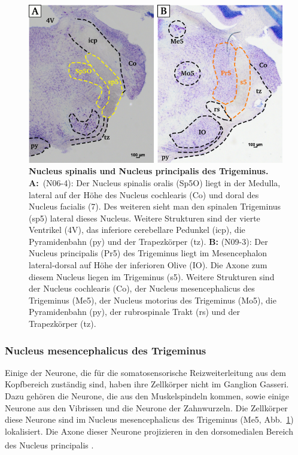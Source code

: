 \documentclass[12pt,a4paper,pdftex]{article}
\begin{document}
\begin{figure}[H]
    \centering
    \includegraphics[width = \textwidth]
    {pictures/somatosensory/somato_kopf.png}
    \caption[Nucleus spinalis und Nucleus principalis des Trigeminus]{\textbf{Nucleus spinalis und Nucleus principalis des Trigeminus.}\\
     \textbf{A:}~(N06-4): Der Nucleus spinalis oralis (Sp5O) liegt in der Medulla, lateral auf der Höhe des Nucleus cochlearis (Co) und doral des Nucleus facialis (7). Des weiteren sieht man den spinalen Trigeminus (sp5) lateral dieses Nucleus. Weitere Strukturen sind der vierte Ventrikel (4V), das inferiore cerebellare Pedunkel (icp), die Pyramidenbahn (py) und der Trapezkörper (tz).
     \textbf{B:} (N09-3): Der Nucleus principalis (Pr5) des Trigeminus liegt im Mesencephalon lateral-dorsal auf Höhe der inferioren Olive (IO). Die Axone zum diesem Nucleus liegen im Trigeminus (s5). Weitere Strukturen sind der Nucleus cochlearis (Co), der Nucleus mesencephalicus des Trigeminus (Me5), der Nucleus motorius des Trigeminus (Mo5),  die Pyramidenbahn (py), der rubrospinale Trakt (rs) und der Trapezkörper (tz).}
    \label{fig:somato_Pr5}
\end{figure}

\subsubsection*{Nucleus mesencephalicus des Trigeminus}
Einige der Neurone, die für die somatosensorische Reizweiterleitung aus dem Kopfbereich zuständig sind, haben ihre Zellkörper nicht im Ganglion Gasseri. Dazu gehören die Neurone, die aus den Muskelspindeln kommen, sowie einige Neurone aus den Vibrissen und die Neurone der Zahnwurzeln. Die Zellkörper diese Neurone sind im Nucleus mesencephalicus des Trigeminus (Me5, Abb.~\ref{fig:somato_Pr5}) lokalisiert. Die Axone dieser Neurone projizieren in den dorsomedialen Bereich des Nucleus principalis  \textsuperscript{\cite[5]{heldmaier2003tierphysiologie}}.
\end{document}
